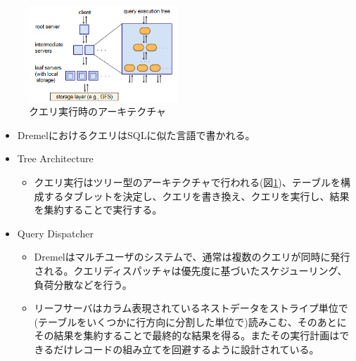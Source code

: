 \documentclass[dvipdfmx,uplatex]{jsarticle}
\theoremstyle{remark}
\newenvironment{method}[1]{
    \begin{tcolorbox}[
        colframe=green!50!black,
        colback=green!50!black!10!white,
        colbacktitle=green!50!black!40!white,
        coltitle=black,
        fonttitle=\bfseries,
        title={#1}
    ]
}{
    \end{tcolorbox}
}
\begin{document}

\begin{figure}
    \centering
    \includegraphics[width=0.5\textwidth]{img/dremel/execution.png}
    \caption{クエリ実行時のアーキテクチャ}
    \label{fig:query-execution}
\end{figure}

\begin{method}{クエリ実行}
\begin{itemize}
    \item DremelにおけるクエリはSQLに似た言語で書かれる。
    \item Tree Architecture
    \begin{itemize}
        \item クエリ実行はツリー型のアーキテクチャで行われる(図\ref{fig:query-execution})、テーブルを構成するタブレットを決定し、クエリを書き換え、クエリを実行し、結果を集約することで実行する。 
    \end{itemize}
    \item Query Dispatcher
    \begin{itemize}
        \item Dremelはマルチユーザのシステムで、通常は複数のクエリが同時に発行される。クエリディスパッチャは優先度に基づいたスケジューリング、負荷分散などを行う。
        \item リーフサーバはカラム表現されているネストデータをストライプ単位で(テーブルをいくつかに行方向に分割した単位で)読みこむ、そのあとにその結果を集約することで最終的な結果を得る。またその実行計画はできるだけレコードの組み立てを回避するように設計されている。
    \end{itemize}
\end{itemize}
\end{method}
\end{document}

